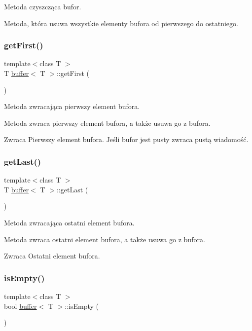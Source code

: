 Metoda czyszcząca bufor. 

Metoda, która usuwa wszystkie elementy bufora od pierwszego do ostatniego. \mbox{\label{classbuffer_a12c4847a2d852f62f6e17cda43d3720d}} 
\subsubsection{\texorpdfstring{get\+First()}{getFirst()}}
{\footnotesize\ttfamily template$<$class T $>$ \\
T \hyperlink{classbuffer}{buffer}$<$ T $>$\+::get\+First (\begin{DoxyParamCaption}{ }\end{DoxyParamCaption})}



Metoda zwracająca pierwszy element bufora. 

Metoda zwraca pierwszy element bufora, a także usuwa go z bufora. \begin{DoxyReturn}{Zwraca}
Pierwszy element bufora. Jeśli bufor jest pusty zwraca pustą wiadomość. 
\end{DoxyReturn}
\mbox{\label{classbuffer_a61bf98727f79c794f4e77b36499a87f9}} 
\subsubsection{\texorpdfstring{get\+Last()}{getLast()}}
{\footnotesize\ttfamily template$<$class T $>$ \\
T \hyperlink{classbuffer}{buffer}$<$ T $>$\+::get\+Last (\begin{DoxyParamCaption}{ }\end{DoxyParamCaption})}



Metoda zwracająca ostatni element bufora. 

Metoda zwraca ostatni element bufora, a także usuwa go z bufora. \begin{DoxyReturn}{Zwraca}
Ostatni element bufora. 
\end{DoxyReturn}
\mbox{\label{classbuffer_a6529128cce7c8b3f85cdae95f22b0589}} 
\subsubsection{\texorpdfstring{is\+Empty()}{isEmpty()}}
{\footnotesize\ttfamily template$<$class T $>$ \\
bool \hyperlink{classbuffer}{buffer}$<$ T $>$\+::is\+Empty (\begin{DoxyParamCaption}{ }\end{DoxyParamCaption})}



